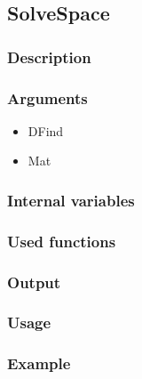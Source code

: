 \subsection{SolveSpace}
\subsubsection{Description}
\subsubsection{Arguments}

\begin{itemize}
\item DFind
\item Mat
\end{itemize}
\subsubsection{Internal variables}
\subsubsection{Used functions}
\subsubsection{Output}
\subsubsection{Usage}
\subsubsection{Example}

